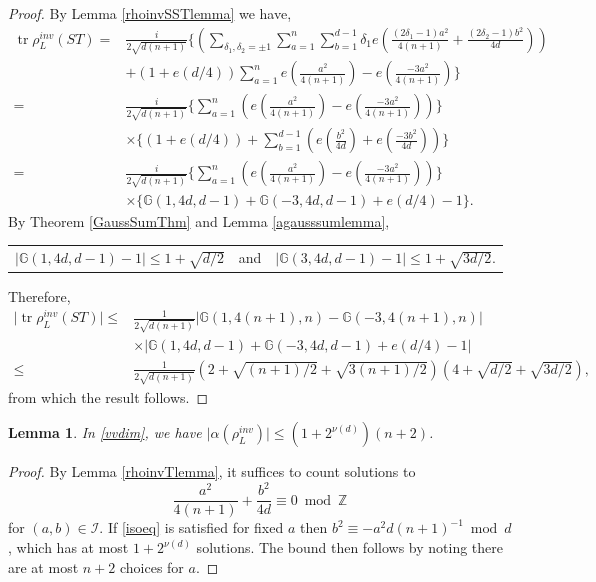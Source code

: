 \documentclass[12pt, a4paper]{article}
\newtheorem{lemma}[thm]{Lemma}
\newcommand{\GG}{\mathbb{G}}
\newcommand{\ZZ}{\mathbb{Z}}
\newcommand{\ic}{\mathcal{I}}
\newcommand{\opn}{\operatorname}
\begin{document}
\begin{proof}
 By Lemma \ref{rhoinvSSTlemma} we have,
 \begin{align*}
   \opn{tr} \rho_L^{inv}(ST)
   = &
   \frac{i}{2 \sqrt{d(n+1)}}
   \Biggl \{
   \left (
   \sum_{\delta_1, \delta_2 = \pm 1}
   \sum_{a=1}^n \sum_{b=1}^{d-1}
   \delta_1 e \left ( \frac{(2\delta_1 - 1) a^2}{4(n+1)} + \frac{(2\delta_2 - 1) b^2}{4d} \right )
   \right ) \\
   & + ( 1 + e(d/4))
   \sum_{a=1}^{n}
   e \left ( \frac{a^2}{4(n+1)}  \right )
   - e \left ( \frac{-3a^2}{4(n+1)}  \right )
   \Biggr \} \\
   = &
   \frac{i}{2 \sqrt{d(n+1)}}
   \Biggl \{
   \sum_{a=1}^n
   \left (
   e \left ( \frac{a^2}{4(n+1)} \right )
   -
   e \left ( \frac{-3a^2}{4(n+1)} \right )
  \right )
  \Biggr \} \\
  & \times
  \Biggl \{
  ( 1 + e(d/4)) + 
  \sum_{b=1}^{d-1}
  \left (
  e \left ( \frac{b^2}{4d} \right ) +  e \left ( \frac{-3b^2}{4d} \right ) \right ) 
  \Biggr \} \\
  = &  
   \frac{i}{2 \sqrt{d(n+1)}}
    \Biggl \{
   \sum_{a=1}^n
   \left (
   e \left ( \frac{a^2}{4(n+1)} \right )
   -
   e \left ( \frac{-3a^2}{4(n+1)} \right )
  \right )
  \Biggr \} \\
  & \times 
  \Biggl \{
  \GG(1, 4d, d-1) + \GG(-3, 4d, d-1) + e(d/4) - 1
  \Biggr \}.
 \end{align*}
 By Theorem \ref{GaussSumThm} and Lemma \ref{agausssumlemma},
 \begin{center}
   \begin{tabular}{c c c}
     $\vert \GG(1, 4d, d-1) - 1 \vert \leq 1 + \sqrt{d/2} $
     & and &
     $\vert \GG(3, 4d, d-1) -1 \vert \leq 1 + \sqrt{3d/2}$.
     \end{tabular}
   \end{center}
 Therefore, 
 \begin{align*}
   \vert \opn{tr} \rho_L^{inv}(ST) \vert
   \leq &
   \frac{1}{2 \sqrt{d(n+1)}}
   \vert \GG(1, 4(n+1), n) - \GG(-3, 4(n+1), n) \vert \\
   & \times      \vert \GG(1, 4d, d-1) + \GG(-3, 4d, d-1) + e(d/4) - 1 \vert \\
\leq &
     \frac{1}{2 \sqrt{d(n+1)}} \left (2 + \sqrt{(n+1)/2} + \sqrt{3(n+1)/2} \right ) \left (4 + \sqrt{d/2} + \sqrt{3d/2} \right ), \end{align*}
 from which the result follows.
\end{proof}
\begin{lemma}\label{aisolemma}
  In \eqref{vvdim}, we have 
  $\vert \alpha(\rho_L^{inv}) \vert \leq  ( 1+ 2^{\nu(d)}  ) ( n+2  )$.  
\end{lemma}
\begin{proof}
  By Lemma \ref{rhoinvTlemma}, it suffices to count solutions to
  \begin{equation}\label{isoeq}
    \frac{a^2}{4(n+1)} + \frac{b^2}{4d} \equiv 0 \bmod{ \ZZ}
  \end{equation}
  for $(a,b) \in \ic$.
  If \eqref{isoeq} is satisfied for fixed $a$ then $b^2 \equiv -a^2 d(n+1)^{-1} \bmod{d}$, which has  at most $1+2^{\nu(d)}$ solutions.
  The bound then follows by noting there are at most $n+2$ choices for $a$.
\end{proof}
\end{document}
